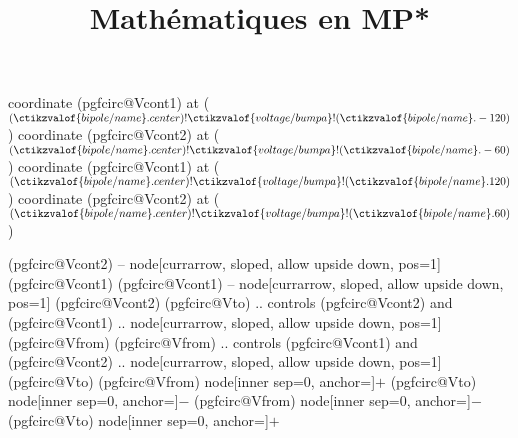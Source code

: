 {                \ifpgf@circuit@germanvoltage
                  \ifpgf@circuit@bipole@voltage@below
                    coordinate (pgfcirc@Vcont1) at ($(\ctikzvalof{bipole/name}.center) ! \ctikzvalof{voltage/bump a} ! (\ctikzvalof{bipole/name}.-120)$)
                    coordinate (pgfcirc@Vcont2) at ($(\ctikzvalof{bipole/name}.center) ! \ctikzvalof{voltage/bump a} ! (\ctikzvalof{bipole/name}.-60)$)
                \else
                    coordinate (pgfcirc@Vcont1) at ($ (\ctikzvalof{bipole/name}.center) ! \ctikzvalof{voltage/bump a} ! (\ctikzvalof{bipole/name}.120)$)
                    coordinate (pgfcirc@Vcont2) at ($ (\ctikzvalof{bipole/name}.center) ! \ctikzvalof{voltage/bump a} ! (\ctikzvalof{bipole/name}.60)$)
                  \fi
                \fi

                \ifpgf@circuit@europeanvoltage
                    \ifpgf@circuit@germanvoltage
                      \ifpgf@circuit@bipole@voltage@backward
                        (pgfcirc@Vcont2)  -- node[currarrow, sloped,  allow upside down, pos=1] {} (pgfcirc@Vcont1)
                      \else
                        (pgfcirc@Vcont1)  -- node[currarrow, sloped,  allow upside down, pos=1] {} (pgfcirc@Vcont2)
                      \fi
                    \else
                      \ifpgf@circuit@bipole@voltage@backward
                        (pgfcirc@Vto) .. controls (pgfcirc@Vcont2)  and (pgfcirc@Vcont1) .. 
                            node[currarrow, sloped,  allow upside down, pos=1] {} 
                        (pgfcirc@Vfrom) 
                      \else
                        (pgfcirc@Vfrom) .. controls (pgfcirc@Vcont1)  and (pgfcirc@Vcont2) ..
                            node[currarrow, sloped,  allow upside down, pos=1] {}
                        (pgfcirc@Vto)   
                      \fi  
                    \fi      
                \else
                    \ifpgf@circuit@bipole@voltage@backward
                        (pgfcirc@Vfrom) node[inner sep=0, anchor=\pgf@circ@bipole@voltage@label@anchor]{\scriptsize$+$}   
                        (pgfcirc@Vto) node[inner sep=0, anchor=\pgf@circ@bipole@voltage@label@anchor]{$-$}
                    \else
                        (pgfcirc@Vfrom) node[inner sep=0, anchor=\pgf@circ@bipole@voltage@label@anchor]{\scriptsize$-$}   
                        (pgfcirc@Vto) node[inner sep=0, anchor=\pgf@circ@bipole@voltage@label@anchor]{$+$}
                    \fi 
                \fi
            }
            \makeatother

\author{}
\title{Mathématiques en MP*}

